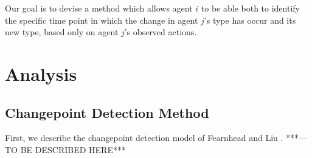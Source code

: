 \documentclass{article}
\begin{document}
Our goal is to devise a method which allows agent $i$ to be able both to identify the specific time point in which the change in agent $j$'s type has occur and its new type, based only on agent $j$'s observed actions.

\section{Analysis}
\subsection{Changepoint Detection Method}

First, we describe the changepoint detection model of Fearnhead and Liu \cite{fearnhead2007line}. ***---TO BE DESCRIBED HERE***
\end{document}
